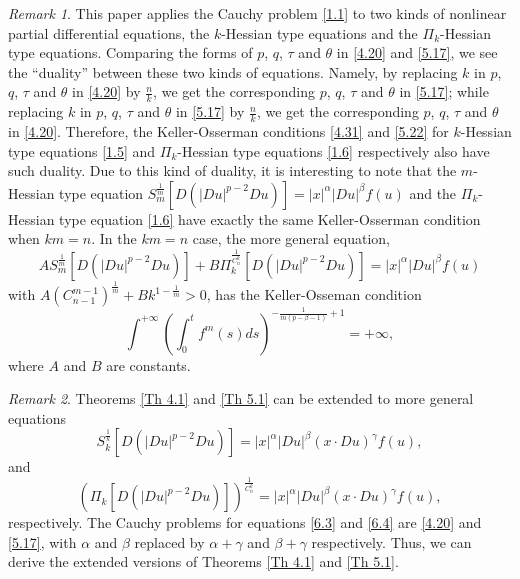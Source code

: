 \documentclass[a4paper,11pt]{amsart}
\theoremstyle{plain}
\theoremstyle{remark}
\newtheorem{remark}{Remark}
\numberwithin{equation}{section}
\numberwithin{figure}{section}
\numberwithin{remark}{section}
\begin{document}
\begin{sloppypar}
\begin{remark}\label{Re 6.4}
This paper applies the Cauchy problem \eqref{1.1} to two kinds of nonlinear partial differential equations, the $k$-Hessian type equations and the $\Pi_k$-Hessian type equations. Comparing the forms of $p$, $q$, $\tau$ and $\theta$ in \eqref{4.20} and \eqref{5.17}, we see the ``duality'' between these two kinds of equations. Namely, by replacing $k$ in $p$, $q$, $\tau$ and $\theta$ in \eqref{4.20} by $\frac{n}{k}$, we get the corresponding $p$, $q$, $\tau$ and $\theta$ in \eqref{5.17}; while replacing $k$ in $p$, $q$, $\tau$ and $\theta$ in \eqref{5.17} by $\frac{n}{k}$, we get the corresponding $p$, $q$, $\tau$ and $\theta$ in \eqref{4.20}. Therefore, the Keller-Osserman conditions \eqref{4.31} and \eqref{5.22} for $k$-Hessian type equations \eqref{1.5} and $\Pi_k$-Hessian type equations \eqref{1.6} respectively also have such duality. Due to this kind of duality, it is interesting to note that the $m$-Hessian type equation $S_m^{\frac{1}{m}} [D(|Du|^{p-2}Du)] = |x|^\alpha |Du|^\beta f(u)$ and the $\Pi_k$-Hessian type equation \eqref{1.6} have exactly the same Keller-Osserman condition when $km=n$. In the $km=n$ case, the more general equation,
\begin{equation}
A S_m^{\frac{1}{m}} [D(|Du|^{p-2}Du)] + B \Pi_k^{\frac{1}{C_n^k}} [D(|Du|^{p-2}Du)] = |x|^\alpha |Du|^\beta f(u)
\end{equation}
with $A(C_{n-1}^{m-1})^{\frac{1}{m}}+ B k^{1-\frac{1}{m}}>0$, has the Keller-Osseman condition 
\begin{equation}
\int^{+\infty} \left (\int_0^t f^{m}(s) ds \right )^{-\frac{1}{m(p-\beta -1)}+1} = + \infty,
\end{equation}
where $A$ and $B$ are constants.
\end{remark}


\begin{remark}\label{Re 6.5}
Theorems \ref{Th 4.1} and \ref{Th 5.1} can be extended to more general equations
\begin{equation}\label{6.3}
	S_k^{\frac{1}{k}} [D(|Du|^{p-2}Du)] = |x|^\alpha |Du|^\beta (x\cdot Du)^\gamma f(u), 
\end{equation}
and 
\begin{equation}\label{6.4}
	\left (\Pi_k[D(|Du|^{p-2}Du)] \right )^{\frac{1}{C_n^k}} = |x|^\alpha  |Du|^\beta (x\cdot Du)^\gamma f(u), 
\end{equation}
respectively. The Cauchy problems for equations \eqref{6.3} and \eqref{6.4} are \eqref{4.20} and \eqref{5.17}, with $\alpha$ and $\beta$ replaced by $\alpha+\gamma$ and $\beta+\gamma$ respectively. Thus, we can derive the extended versions of Theorems \ref{Th 4.1} and \ref{Th 5.1}.
\end{remark}


\end{sloppypar}
\end{document}
